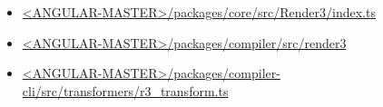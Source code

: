 
\begin{itemize}
  \item \href{https://github.com/angular/angular/blob/master/packages/core/src/render3/index.ts}
        {<ANGULAR-MASTER>/packages/core/src/Render3/index.ts}
\end{itemize}








\begin{itemize}
  \item \href{https://github.com/angular/angular/tree/master/packages/compiler/src/render3}
        {<ANGULAR-MASTER>/packages/compiler/src/render3}
  \item \href{https://github.com/angular/angular/blob/master/packages/compiler-cli/src/transformers/r3_transform.ts}
        {<ANGULAR-MASTER>/packages/compiler-cli/src/transformers/r3\_transform.ts}
\end{itemize}

